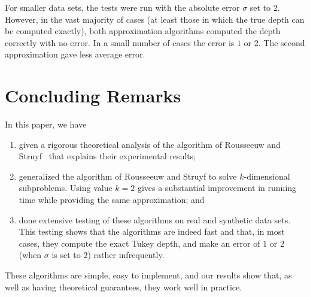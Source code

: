 \documentclass [letterpaper] {article}
\begin{document}
For smaller data sets, the tests were run with the absolute error $\sigma$ set to $2$. However, in the vast majority of cases (at least those in which the true depth can be computed exactly), both approximation algorithms computed the depth correctly with no error. In a small number of cases the error is $1$ or $2$. The second approximation gave less average error.

\section{Concluding Remarks}
\label{sec:cld}

In this paper, we have
\begin{enumerate}
\item given a rigorous theoretical analysis of the algorithm of Rousseeuw and Struyf~\cite{Rousseeuw98} that explains their experimental results;
\item generalized the algorithm of Rousseeuw and Struyf to solve $k$-dimensional subproblems. Using value $k = 2$ gives a substantial improvement in running time while providing the same approximation; and
\item done extensive testing of these algorithms on real and synthetic data sets. This testing shows that the algorithms are indeed fast and that, in most cases, they compute the exact Tukey depth, and make an error of $1$ or $2$ (when $\sigma$ is set to $2$) rather infrequently.
\end{enumerate}

These algorithms are simple, easy to implement, and our results show that, as well as having theoretical guarantees, they work well in practice.



\end{document}
